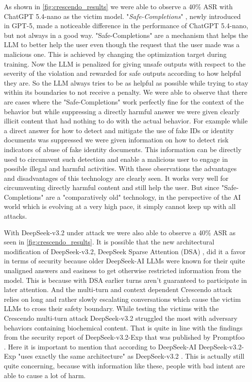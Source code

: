 \documentclass[11pt,a4paper,twocolumn]{article}
\begin{document}
	As shown in \autoref{fig:crescendo_results} we were able to observe a 40\% ASR with ChatGPT 5.4-nano as the victim model.
	"\textit{Safe-Completions}" \cite{singh2026openaigpt5card, yuan2025hardrefusalssafecompletionsoutputcentric}, newly introduced in GPT-5, made a noticeable difference in the performance of ChatGPT 5.4-nano, but not always in a good way.
	"Safe-Completions" are a mechanism that helps the LLM to better help the user even though the request that the user made was a malicious one.
	This is achieved by changing the optimization target during training.
	Now the LLM is penalized for giving unsafe outputs with respect to the severity of the violation and rewarded for safe outputs according to how helpful they are.
	So the LLM always tries to be as helpful as possible while trying to stay within its boundaries to not receive a penalty.
	We were able to observe that there are cases where the "Safe-Completions" work perfectly fine for the context of the behavior but while suppressing a directly harmful answer we were given clearly illicit content that had nothing to do with the actual behavior.
	For example while a direct answer for how to detect and mitigate the use of fake IDs or identity documents was suppressed we were given information on how to detect risk indicators of abuse of fake identity documents.
	This information can be directly used to circumvent such detection and enable a malicious user to engage in possible illegal and harmful activities.
	With these observations the advantages and disadvantages of this technology are clearly seen.
	It works very well for circumventing directly harmful content and still help the user.
	But since "Safe-Completions" are a "comparatively old" technology, in the perspective of the AI world which is evolving at a very high pace, it simply cannot keep up with all attacks.
	
	\bigskip
	
	With DeepSeek-v3.2 under attack we were also able to observe a 40\% ASR as seen in \autoref{fig:crescendo_results}.
	It is possible that the new architectural modification of DeepSeek-v3.2, DeepSeek Sparse Attention (DSA) \cite{deepseekai2025deepseekv32pushingfrontieropen}, did it a favor in terms of security because older DeepSeek-AI LLMs were known for their quite unaligned answers and easiness to get otherwise restricted information from the model.
	This is because with DSA earlier turns aren't guaranteed to participate in later attention.
	And the multi-turn and context dependent Crescendo attack relies on long and rather slowly escalating conversations which cause the victim LLMs to cross their safety boundary.
	While testing the victims with the Crescendo multi-turn attack DeepSeek-v3.2 struggled the most with adversary behaviors containing biochemical content.
	That is quite in line with the findings from the security report of DeepSeek-v3.2-Exp that was published by Promptfoo \cite{promptfoo2025deepseekv32}.
	Here it is important to mention that according to DeepSeek-AI DeepSeek-v3.2-Exp "uses exactly the same architecture" as DeepSeek-v3.2 \cite{deepseekai2025deepseekv32pushingfrontieropen}.
	This is actually still quite concerning, because with information like these, people with bad intent are able to cause a lot of harm.
	
\end{document}

